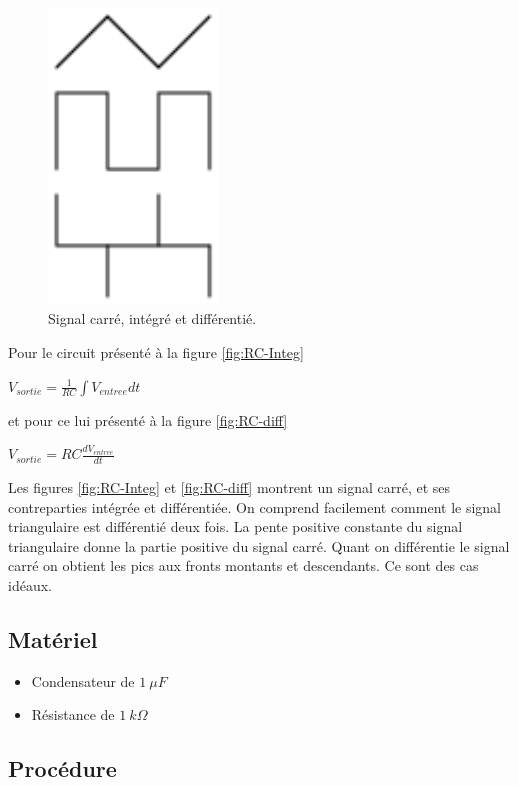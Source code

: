 \documentclass{book}
\begin{document}
\begin{figure}[h!]
\begin{center}
\caption{\label{fig:RC-Integ-diff}Signal carré, intégré et différentié. }\vspace{0.5em}
\includegraphics[width=0.4\textwidth, height=0.3\textwidth, keepaspectratio]{Pic-triwave-diff.png}
\end{center}
\end{figure}



Pour le circuit présenté à la figure  \ref{fig:RC-Integ}



$V_{sortie}=\frac{1}{RC}\int V_{entree}dt$



et pour ce lui présenté à la figure  \ref{fig:RC-diff}



$V_{sortie}=RC\frac{dV_{entree} }{dt}$



Les figures  \ref{fig:RC-Integ} et  \ref{fig:RC-diff} montrent un signal carré, et ses contreparties intégrée et différentiée. On comprend facilement comment le signal triangulaire est différentié deux fois. La pente positive constante du signal triangulaire donne la partie positive du signal carré. Quant on différentie le signal carré on obtient les pics aux fronts montants et descendants. Ce sont des cas idéaux.

\subsection{Matériel}


\begin{itemize}
  \item Condensateur de $1\ \mu F$
  \item Résistance de $1\ k\Omega$
\end{itemize}

\subsection{Procédure}
\end{document}
